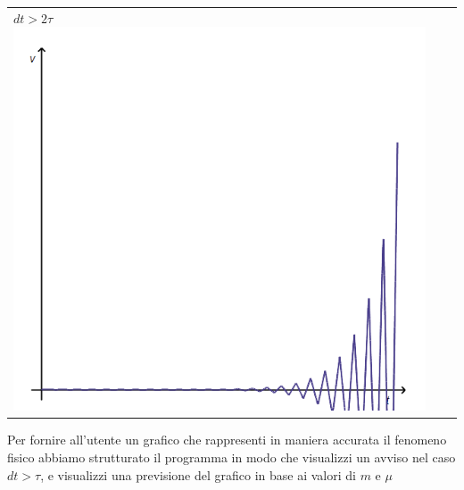\documentclass[11pt]{article} %
\begin{document}
\begin{table}[h]
\begin{tabular}{lll}
$dt > 2\tau$ \includegraphics[scale=0.4]{5.png}
\end{tabular}
\end{table}
Per fornire all'utente un grafico che rappresenti in maniera accurata il fenomeno fisico abbiamo strutturato il programma in modo che visualizzi un avviso nel caso $dt > \tau$, e visualizzi una previsione del grafico in base ai valori di $m$ e $\mu$

\newpage
\end{document}
